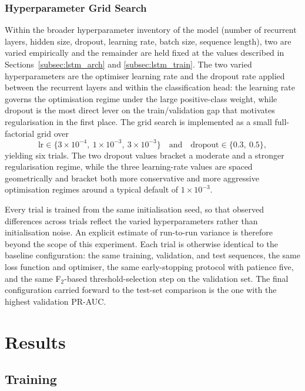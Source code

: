 \documentclass[oneside,12pt,parskip=half,american,numbers=noenddot]{scrreprt}
\begin{document}
\subsection{Hyperparameter Grid Search}
\label{subsec:lstm_grid}

Within the broader hyperparameter inventory of the model (number of recurrent layers, hidden size, dropout, learning rate, batch size, sequence length), two are varied empirically and the remainder are held fixed at the values described in Sections~\ref{subsec:lstm_arch} and \ref{subsec:lstm_train}. The two varied hyperparameters are the optimiser learning rate and the dropout rate applied between the recurrent layers and within the classification head: the learning rate governs the optimisation regime under the large positive-class weight, while dropout is the most direct lever on the train/validation gap that motivates regularisation in the first place. The grid search is implemented as a small full-factorial grid over
\[
\text{lr} \in \{3\times 10^{-4},\ 1\times 10^{-3},\ 3\times 10^{-3}\}
\quad \text{and} \quad
\text{dropout} \in \{0.3,\ 0.5\},
\]
yielding six trials. The two dropout values bracket a moderate and a stronger regularisation regime, while the three learning-rate values are spaced geometrically and bracket both more conservative and more aggressive optimisation regimes around a typical default of $1\times 10^{-3}$.

Every trial is trained from the same initialisation seed, so that observed differences across trials reflect the varied hyperparameters rather than initialisation noise. An explicit estimate of run-to-run variance is therefore beyond the scope of this experiment. Each trial is otherwise identical to the baseline configuration: the same training, validation, and test sequences, the same loss function and optimiser, the same early-stopping protocol with patience five, and the same F$_2$-based threshold-selection step on the validation set. The final configuration carried forward to the test-set comparison is the one with the highest validation PR-AUC.




\pagebreak
\chapter{Results}
\section{Training}
\label{sec:training_results}
\end{document}
